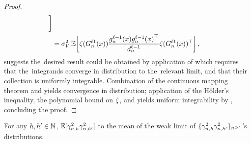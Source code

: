 \begin{proof}
\begin{align*}
        \biggr]
        \\
        &=
        \sigma_{V}^2
        \operatorname*{\mathbb{E}} \biggl[
            \zeta(G_{n}^{\ell 1} (x))
            \frac{
                {g}^{\ell - 1}_{n}{(x)}
                {g}^{\ell - 1}_{n}{(x)}^\top
            }{d_{n}^{\ell - 1}}
            \zeta(G_{n}^{\ell 1} (x))^\top
        \biggr]
        \, ,
    \end{align*}
    suggests the~desired result could be obtained by application of  which requires that the~integrands converge in distribution to the~relevant limit, and that their collection is uniformly integrable.
    Combination of the continuous mapping theorem and  yields convergence in distribution; application of the H{\" o}lder's inequality, the polynomial bound on $\zeta$, and  yields uniform integrability by , concluding the proof.
\end{proof}


\begin{lemma}\label{lem:head_all_sqmoments_converge}
    For any $h, h' \in \mathbb{N}$, $\operatorname*{\mathbb{E}} \lbrack  \gamma_{n , h}^2 \gamma_{n , h'}^2 \rbrack$ 
    to the mean of the weak limit of $\{ \gamma_{n , h}^2 \gamma_{n , h'}^2 \}_{n \geq 1}$'s distributions.
\end{lemma}

